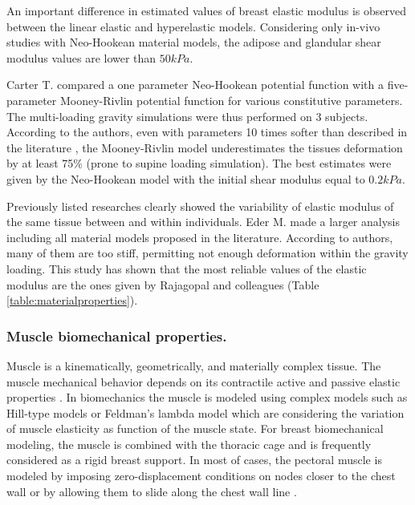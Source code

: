 An important difference in estimated values of breast elastic modulus is observed between the linear elastic and hyperelastic models. Considering only in-vivo studies with Neo-Hookean material models, the adipose and glandular shear modulus values are lower than $50kPa$. 

Carter T. \citep{carter_biomechanical_2009} compared a one parameter Neo-Hookean potential function with a five-parameter Mooney-Rivlin potential function for various constitutive parameters. The multi-loading gravity simulations were thus performed on 3 subjects. According to the authors, even with parameters 10 times softer than described in  the literature \citep{abbas_biomechanical_2001}, the Mooney-Rivlin model underestimates the tissues deformation by at least 75\% (prone to supine loading simulation). The best estimates were given by the Neo-Hookean model with the initial shear modulus equal to $0.2kPa$.  

Previously listed researches clearly showed the variability of elastic modulus of the same tissue between and within individuals. Eder M. \citep{eder_comparison_2014} made a larger analysis including all material models proposed in the literature. According to authors, many of them are too stiff, permitting not enough deformation within the gravity loading. This study has shown that the most reliable values of the elastic modulus are the ones given by Rajagopal and colleagues \citep{rajagopal_creating_2008} (Table \ref{table:materialproperties}).

\subsubsection*{Muscle biomechanical properties.} 
Muscle is a kinematically, geometrically, and materially complex tissue. The muscle mechanical behavior depends on its contractile active and passive elastic properties \citep{nordez_muscle_2010}. In biomechanics the muscle is modeled using complex models such as Hill-type models
\citep{zajac_muscle_1989} or Feldman’s lambda model \citep{feldman_once_1986} which are considering the variation of muscle elasticity as function of  the muscle state. For breast biomechanical modeling, the muscle is combined with the thoracic cage and is frequently considered as a rigid breast support. In most of cases, the pectoral muscle is modeled by imposing zero-displacement conditions on nodes closer to the chest wall \citep{abbas_biomechanical_2001,chung_modelling_2008,rajagopal_mapping_2010}  
or by allowing them to slide along the chest wall line \citep{han_nonlinear_2014,georgii_simulation_2016}.   

